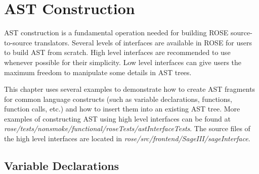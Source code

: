 \clearpage
\chapter{AST Construction}
AST construction is a fundamental operation needed for building ROSE
source-to-source translators. Several levels of interfaces are available in
ROSE for users to build AST from scratch. 
High level interfaces are recommended to use whenever possible for their
simplicity. Low level interfaces can give users the maximum freedom to
manipulate some details in AST trees.


This chapter uses several examples to demonstrate how to 
create AST fragments for common language
constructs (such as variable declarations, functions, function calls, etc.)
  and how to insert them into an existing AST tree.
More examples of constructing AST using high level interfaces can be found at
\textit{rose/tests/nonsmoke/functional/roseTests/astInterfaceTests}. 
The source files of the high level interfaces are located in
\textit{rose/src/frontend/SageIII/sageInterface}.

\section{Variable Declarations}

